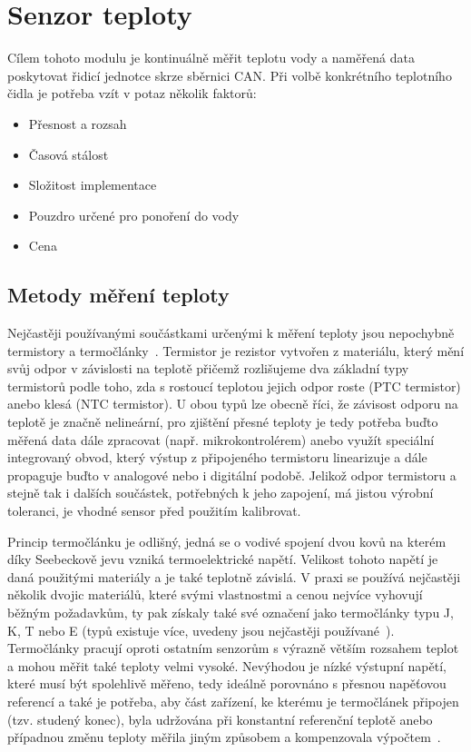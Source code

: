 \section{Senzor teploty}
\label{sec:perif-sensor-teploty}
    Cílem tohoto modulu je kontinuálně měřit teplotu vody a naměřená data poskytovat řidicí jednotce skrze sběrnici CAN. Při volbě konkrétního teplotního čidla je potřeba vzít v potaz několik faktorů:
    \begin{itemize}
        \item Přesnost a rozsah
        \item Časová stálost
        \item Složitost implementace 
        \item Pouzdro určené pro ponoření do vody
        \item Cena
    \end{itemize}

    \subsection{Metody měření teploty}
        Nejčastěji používanými součástkami určenými k měření teploty jsou nepochybně termistory a termočlánky~\cite{allaboutcircuits2023tempsensors}. Termistor je rezistor vytvořen z materiálu, který mění svůj odpor v závislosti na teplotě přičemž rozlišujeme dva základní typy termistorů podle toho, zda s rostoucí teplotou jejich odpor roste (PTC termistor) anebo klesá (NTC termistor). U obou typů lze obecně říci, že závisost odporu na teplotě je značně nelineární, pro zjištění přesné teploty je tedy potřeba buďto měřená data dále zpracovat (např. mikrokontrolérem) anebo využít speciální integrovaný obvod, který výstup z připojeného termistoru linearizuje a dále propaguje buďto v analogové nebo i digitální podobě. Jelikož odpor termistoru a stejně tak i dalších součástek, potřebných k jeho zapojení, má jistou výrobní toleranci, je vhodné sensor před použitím kalibrovat.

        Princip termočlánku je odlišný, jedná se o vodivé spojení dvou kovů na kterém díky Seebeckově jevu vzniká termoelektrické napětí. Velikost tohoto napětí je daná použitými materiály a je také teplotně závislá. V praxi se používá nejčastěji několik dvojic materiálů, které svými vlastnostmi a cenou nejvíce vyhovují běžným požadavkům, ty pak získaly také své označení jako termočlánky typu J, K, T nebo E (typů existuje více, uvedeny jsou nejčastěji používané~\cite{TechieScience_Thermocouples}). Termočlánky pracují oproti ostatním senzorům s výrazně větším rozsahem teplot a mohou měřit také teploty velmi vysoké. Nevýhodou je nízké výstupní napětí, které musí být spolehlivě měřeno, tedy ideálně porovnáno s přesnou napěťovou referencí a také je potřeba, aby část zařízení, ke kterému je termočlánek připojen (tzv. studený konec), byla udržována při konstantní referenční teplotě anebo případnou změnu teploty měřila jiným způsobem a kompenzovala výpočtem~\cite{allaboutcircuits2023tempsensors,TechieScience_Thermocouples}.

